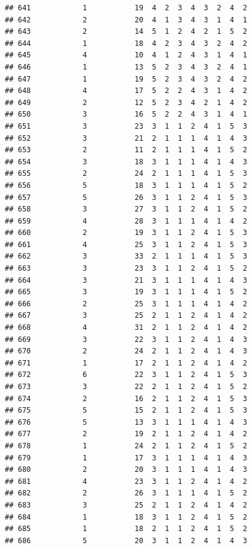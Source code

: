 \documentclass[12pt,]{krantz}
\theoremstyle{definition}
\theoremstyle{definition}
\theoremstyle{remark}
\begin{document}
\begin{verbatim}
## 641            1           19  4  2  3  4  3  2  4  2
## 642            2           20  4  1  3  4  3  1  4  1
## 643            2           14  5  1  2  4  2  1  5  2
## 644            1           18  4  2  3  4  3  2  4  2
## 645            4           10  4  1  2  4  3  1  4  1
## 646            1           13  5  2  3  4  3  2  4  1
## 647            1           19  5  2  3  4  3  2  4  2
## 648            4           17  5  2  2  4  3  1  4  2
## 649            2           12  5  2  3  4  2  1  4  2
## 650            3           16  5  2  2  4  3  1  4  1
## 651            3           23  3  1  1  2  4  1  5  3
## 652            3           21  2  1  1  1  4  1  4  3
## 653            2           11  2  1  1  1  4  1  5  2
## 654            3           18  3  1  1  1  4  1  4  3
## 655            2           24  2  1  1  1  4  1  5  3
## 656            5           18  3  1  1  1  4  1  5  2
## 657            5           26  3  1  1  2  4  1  5  3
## 658            3           27  3  1  1  2  4  1  5  2
## 659            4           28  3  1  1  1  4  1  4  2
## 660            2           19  3  1  1  2  4  1  5  3
## 661            4           25  3  1  1  2  4  1  5  3
## 662            3           33  2  1  1  1  4  1  5  3
## 663            3           23  3  1  1  2  4  1  5  2
## 664            3           21  3  1  1  1  4  1  4  3
## 665            3           19  3  1  1  1  4  1  5  2
## 666            2           25  3  1  1  1  4  1  4  2
## 667            3           25  2  1  1  2  4  1  4  2
## 668            4           31  2  1  1  2  4  1  4  2
## 669            3           22  3  1  1  2  4  1  4  3
## 670            2           24  2  1  1  2  4  1  4  3
## 671            1           17  2  1  1  2  4  1  4  2
## 672            6           22  3  1  1  2  4  1  5  3
## 673            3           22  2  1  1  2  4  1  5  2
## 674            2           16  2  1  1  2  4  1  5  3
## 675            5           15  2  1  1  2  4  1  5  3
## 676            5           13  3  1  1  1  4  1  4  3
## 677            2           19  2  1  1  2  4  1  4  2
## 678            1           24  2  1  1  2  4  1  5  2
## 679            1           17  3  1  1  1  4  1  4  3
## 680            2           20  3  1  1  1  4  1  4  3
## 681            4           23  3  1  1  2  4  1  4  2
## 682            2           26  3  1  1  1  4  1  5  2
## 683            3           25  2  1  1  2  4  1  4  2
## 684            1           18  3  1  1  2  4  1  5  2
## 685            1           18  2  1  1  2  4  1  5  2
## 686            5           20  3  1  1  2  4  1  4  3

\end{verbatim}
\end{document}
